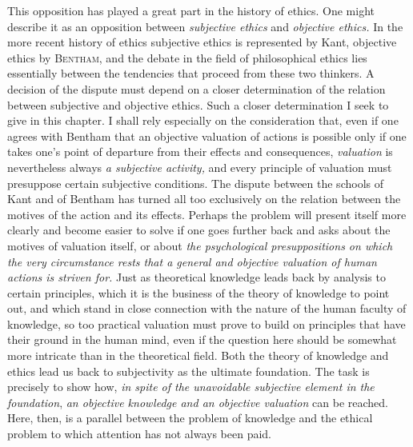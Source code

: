 \documentclass[12pt,a4paper,openany]{book}
\newcommand{\opage}[1]{\marginnote{\footnotesize\textit{[#1]}}}
\begin{document}
This opposition has played a great part in the history of ethics. One might describe it as an
opposition between \textit{subjective ethics} and \textit{objective ethics.} In the more recent history
of ethics subjective ethics is represented by Kant, objective ethics by \textsc{Bentham}, and the
debate in the field of philosophical ethics lies essentially between the tendencies that proceed
from these two thinkers. A decision of the dispute must depend on a closer determination of the
relation between subjective and objective ethics. Such a closer determination I seek to give in
this chapter. I shall rely especially on the consideration that, even if one agrees with Bentham
that an objective valuation of actions is possible only if one takes one's point of departure from
their effects and consequences, \textit{valuation} is nevertheless always \textit{a subjective
activity,} and every principle of valuation must presuppose certain subjective conditions. The
dispute between the schools of Kant and of Bentham has turned all too exclusively on the relation
between the motives of the action and its effects. Perhaps the problem will present itself more
clearly and become easier to solve if one goes further back and asks about the motives of
valuation itself, or about \textit{the psychological presuppositions on which the very circumstance
rests that a general and objective valuation of human actions is striven for.} Just as theoretical
knowledge leads back by analysis to certain principles, which it is the business of the theory of
knowledge to point out, and which stand in close connection with
\opage{27}the nature of the human faculty of knowledge, so too practical valuation must prove to build on
principles that have their ground in the human mind, even if the question here should be somewhat
more intricate than in the theoretical field. Both the theory of knowledge and ethics lead us back
to subjectivity as the ultimate foundation. The task is precisely to show how, \textit{in spite of
the unavoidable subjective element in the foundation}, \textit{an objective knowledge and an
objective valuation} can be reached. Here, then, is a parallel between the problem of knowledge and
the ethical problem to which attention has not always been paid.
\end{document}

